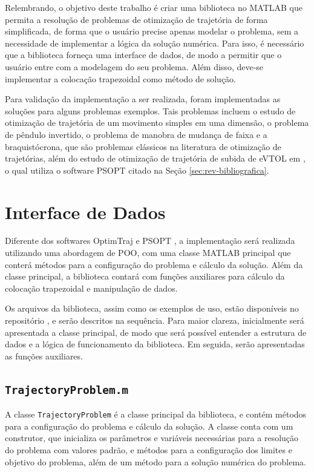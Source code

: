 Relembrando, o objetivo deste trabalho é criar uma biblioteca no MATLAB que permita a resolução de problemas de otimização de trajetória de forma simplificada, de forma que o usuário precise apenas modelar o problema, sem a necessidade de implementar a lógica da solução numérica. Para isso, é necessário que a biblioteca forneça uma interface de dados, de modo a permitir que o usuário entre com a modelagem do seu problema. Além disso, deve-se implementar a colocação trapezoidal como método de solução.

Para validação da implementação a ser realizada, foram implementadas as soluções para alguns problemas exemplos. Tais problemas incluem o estudo de otimização de trajetória de um movimento simples em uma dimensão, o problema de pêndulo invertido, o problema de manobra de mudança de faixa e a braquistócrona, que são problemas clássicos na literatura de otimização de trajetórias, além do estudo de otimização de trajetória de subida de eVTOL em \cite{costa_otimizacao_2023}, o qual utiliza o software PSOPT citado na Seção \ref{sec:rev-bibliografica}.

\section{Interface de Dados}
\label{sec:interface-dados}

Diferente dos softwares OptimTraj \cite{kelly_optimtraj_2022} e PSOPT \cite{becerra_psopt_2022}, a implementação será realizada utilizando uma abordagem de POO, com uma classe MATLAB principal que conterá métodos para a configuração do problema e cálculo da solução. Além da classe principal, a biblioteca contará com funções auxiliares para cálculo da colocação trapezoidal e manipulação de dados.

Os arquivos da biblioteca, assim como os exemplos de uso, estão disponíveis no repositório \cite{simplicio_hsimpliciotg-ita_2024}, e serão descritos na sequência. Para maior clareza, inicialmente será apresentada a classe principal, de modo que será possível entender a estrutura de dados e a lógica de funcionamento da biblioteca. Em seguida, serão apresentadas as funções auxiliares.

\subsection{\texttt{TrajectoryProblem.m}}
\label{subsec:classe-trajectoryproblem}

A classe \texttt{TrajectoryProblem} é a classe principal da biblioteca, e contém métodos para a configuração do problema e cálculo da solução. A classe conta com um construtor, que inicializa os parâmetros e variáveis necessárias para a resolução do problema com valores padrão, e métodos para a configuração dos limites e objetivo do problema, além de um método para a solução numérica do problema.

